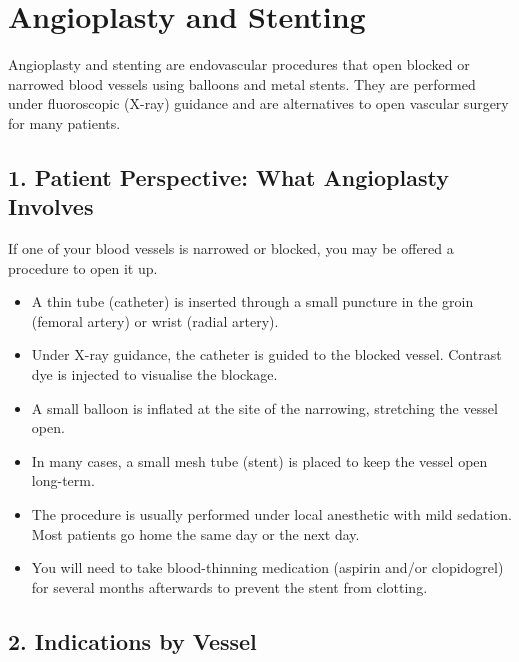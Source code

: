 \chapter{Angioplasty and Stenting}

\label{ch:ch79_angioplasty}

Angioplasty and stenting are endovascular procedures that open blocked or narrowed blood vessels using balloons and metal stents. They are performed under fluoroscopic (X-ray) guidance and are alternatives to open vascular surgery for many patients.


\section{1. Patient Perspective: What Angioplasty Involves}

If one of your blood vessels is narrowed or blocked, you may be offered a procedure to open it up.

\begin{itemize}
  \item A thin tube (catheter) is inserted through a small puncture in the groin (femoral artery) or wrist (radial artery).
  \item Under X-ray guidance, the catheter is guided to the blocked vessel. Contrast dye is injected to visualise the blockage.
  \item A small balloon is inflated at the site of the narrowing, stretching the vessel open.
  \item In many cases, a small mesh tube (stent) is placed to keep the vessel open long-term.
  \item The procedure is usually performed under local anesthetic with mild sedation. Most patients go home the same day or the next day.
  \item You will need to take blood-thinning medication (aspirin and/or clopidogrel) for several months afterwards to prevent the stent from clotting.
\end{itemize}


\section{2. Indications by Vessel}

